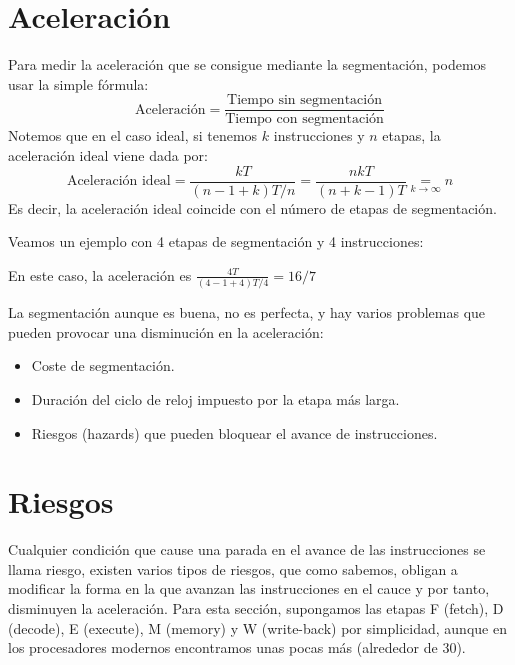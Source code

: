 \section{Aceleración}
Para medir la aceleración que se consigue mediante la segmentación, podemos usar la simple fórmula:
\begin{equation*}
    \text{Aceleración} = \frac{\text{Tiempo sin segmentación}}{\text{Tiempo con segmentación}}
\end{equation*}
Notemos que en el caso ideal, si tenemos $k$ instrucciones y $n$ etapas, la aceleración ideal viene dada por:
\begin{equation*}
    \text{Aceleración ideal} = \frac{kT}{(n-1 + k) T/n} = \frac{nkT}{(n+k-1)T} \underset{k \rightarrow \infty}{=} n
\end{equation*}
Es decir, la aceleración ideal coincide con el número de etapas de segmentación.
\begin{ejemplo}
    Veamos un ejemplo con 4 etapas de segmentación y 4 instrucciones:
    \begin{center}
        
    \end{center}
    En este caso, la aceleración es $ \frac{4T}{(4-1+4)T/4} = 16/7$
\end{ejemplo}
La segmentación aunque es buena, no es perfecta, y hay varios problemas que pueden provocar una disminución en la aceleración: 
\begin{itemize}
    \item Coste de segmentación.
    \item Duración del ciclo de reloj impuesto por la etapa más larga.
    \item Riesgos (hazards) que pueden bloquear el avance de instrucciones.
\end{itemize}
\section{Riesgos}
Cualquier condición que cause una parada en el avance de las instrucciones se llama riesgo, existen varios tipos de riesgos,
que como sabemos, obligan a modificar la forma en la que avanzan las instrucciones en el cauce y por tanto, disminuyen la aceleración. Para esta sección, supongamos las etapas 
F (fetch), D (decode), E (execute), M (memory) y W (write-back) por simplicidad, aunque en los procesadores modernos encontramos unas pocas más (alrededor de 30).
